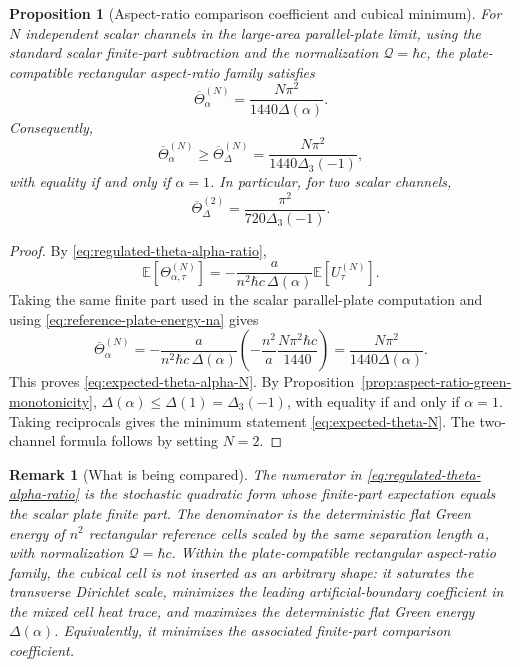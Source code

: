 \documentclass[11pt]{article}
\newtheorem{proposition}[theorem]{Proposition}
\newtheorem{remark}[theorem]{Remark}
\newcommand{\E}{\mathbb{E}}
\begin{document}
\begin{proposition}[Aspect-ratio comparison coefficient and cubical minimum]
\label{prop:expected-theta}
For \(N\) independent scalar channels in the large-area parallel-plate limit,
using the standard scalar finite-part subtraction and the normalization
\(\mathcal Q=\hbar c\), the plate-compatible rectangular aspect-ratio family
satisfies
\begin{equation}
    \overline{\Theta}_{\alpha}^{(N)}
    =
    \frac{N\pi^2}{1440\Delta(\alpha)}.
    \label{eq:expected-theta-alpha-N}
\end{equation}
Consequently,
\begin{equation}
    \overline{\Theta}_{\alpha}^{(N)}
    \geq
    \overline{\Theta}_{\Delta}^{(N)}
    =
    \frac{N\pi^2}{1440\Delta_3(-1)},
    \label{eq:expected-theta-N}
\end{equation}
with equality if and only if \(\alpha=1\).  In particular, for two scalar
channels,
\begin{equation}
    \overline{\Theta}_{\Delta}^{(2)}
    =
    \frac{\pi^2}{720\Delta_3(-1)}.
    \label{eq:expected-theta-two-channel}
\end{equation}
\end{proposition}

\begin{proof}
By \eqref{eq:regulated-theta-alpha-ratio},
\[
    \E[\Theta_{\alpha,\tau}^{(N)}]
    =
    -\frac{a}{n^2\hbar c\,\Delta(\alpha)}
    \E[U_\tau^{(N)}].
\]
Taking the same finite part used in the scalar parallel-plate computation
and using \eqref{eq:reference-plate-energy-na} gives
\[
    \overline{\Theta}_{\alpha}^{(N)}
    =
    -\frac{a}{n^2\hbar c\,\Delta(\alpha)}
    \left(
        -\frac{n^2}{a}\frac{N\pi^2\hbar c}{1440}
    \right)
    =
    \frac{N\pi^2}{1440\Delta(\alpha)}.
\]
This proves \eqref{eq:expected-theta-alpha-N}.  By
Proposition~\ref{prop:aspect-ratio-green-monotonicity},
\(\Delta(\alpha)\leq\Delta(1)=\Delta_3(-1)\), with equality if and only if
\(\alpha=1\).  Taking reciprocals gives the minimum statement
\eqref{eq:expected-theta-N}.  The two-channel formula follows by setting
\(N=2\).
\end{proof}

\begin{remark}[What is being compared]
The numerator in \eqref{eq:regulated-theta-alpha-ratio} is the stochastic
quadratic form whose finite-part expectation equals the scalar plate finite
part.  The denominator is the deterministic flat Green energy of \(n^2\)
rectangular reference cells scaled by the same separation length \(a\), with
normalization \(\mathcal Q=\hbar c\).  Within the plate-compatible rectangular
aspect-ratio family, the cubical cell is not inserted as an arbitrary shape:
it saturates the transverse Dirichlet scale, minimizes the leading
artificial-boundary coefficient in the mixed cell heat trace, and maximizes
the deterministic flat Green energy \(\Delta(\alpha)\).  Equivalently, it
minimizes the associated finite-part comparison coefficient.
\end{remark}
\end{document}
